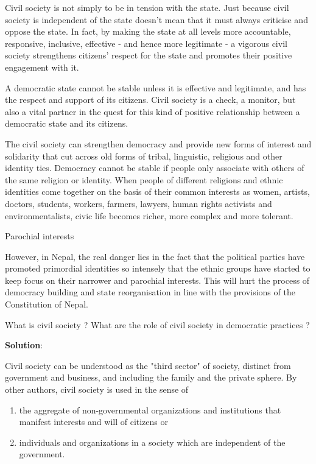 \documentclass[
  openany]{book}
\newcommand{\question}{\item}
\newenvironment{solution}{ {\bfseries Solution}:}{}
\begin{document}
\begin{questions}
Civil society is not simply to be in tension with the state. Just because civil society is independent of the state doesn't mean that it must always criticise and oppose the state. In fact, by making the state at all levels more accountable, responsive, inclusive, effective - and hence more legitimate - a vigorous civil society strengthens citizens' respect for the state and promotes their positive engagement with it.

A democratic state cannot be stable unless it is effective and legitimate, and has the respect and support of its citizens.  Civil society is a check, a monitor, but also a vital partner in the quest for this kind of positive relationship between a democratic state and its citizens.

The  civil society can strengthen democracy and provide new forms of interest and solidarity that cut across old forms of tribal, linguistic, religious and other identity ties. Democracy cannot be stable if people only associate with others of the same religion or identity. When people of different religions and ethnic identities come together on the basis of their common interests as women, artists, doctors, students, workers, farmers, lawyers, human rights activists and environmentalists, civic life becomes richer, more complex and more tolerant.

Parochial interests

However, in Nepal, the real danger lies in the fact that the political parties have promoted primordial identities so intensely that the ethnic groups have started to keep focus on their narrower and parochial interests. This will hurt the process of democracy building and state reorganisation in line with the provisions of the Constitution of Nepal.

\question What is civil society ? What are the role of civil society in democratic practices ?

\begin{solution}

Civil society can be understood as the "third sector" of society, distinct from government and business, and including the family and the private sphere. By other authors, civil society is used in the sense of 

\begin{enumerate}
\item the aggregate of non-governmental organizations and institutions that manifest interests and will of citizens or 
\item individuals and organizations in a society which are independent of the government.
\end{enumerate}


\end{solution}
\end{questions}
\end{document}
